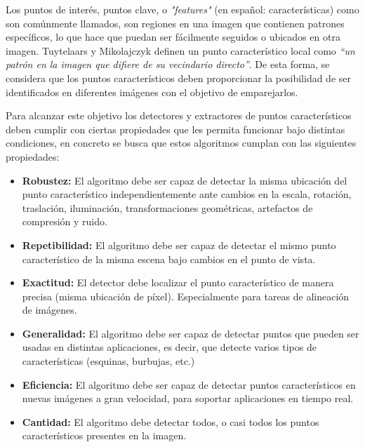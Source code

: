 Los puntos de interés, puntos clave, o \textit{"features"} (en español: características) como son comúnmente llamados, son regiones en una imagen que contienen patrones específicos, lo que hace que puedan ser fácilmente seguidos o ubicados en otra imagen. Tuytelaars y Mikolajczyk \cite{Tuytelaars} definen un punto característico local como \textit{``un patrón en la imagen que difiere de su vecindario directo''}. De esta forma, se considera que los puntos característicos deben proporcionar la posibilidad de ser identificados en diferentes imágenes con el objetivo de emparejarlos.

Para alcanzar este objetivo los detectores y extractores de puntos característicos deben cumplir con ciertas propiedades que les permita funcionar bajo distintas condiciones, en concreto se busca que estos algoritmos cumplan con las siguientes propiedades:

\begin{itemize}
	\item \textbf{Robustez:} El algoritmo debe ser capaz de detectar la misma ubicación del punto característico independientemente ante cambios en la escala, rotación, traslación, iluminación, transformaciones geométricas, artefactos de compresión y ruido.
	
	\item \textbf{Repetibilidad:} El algoritmo debe ser capaz de detectar el mismo punto característico de la misma escena bajo cambios en el punto de vista.
	
	\item \textbf{Exactitud:} El detector debe localizar el punto característico de manera precisa (misma ubicación de píxel). Especialmente para tareas de alineación de imágenes.
	
	\item \textbf{Generalidad:} El algoritmo debe ser capaz de detectar puntos que pueden ser usadas en distintas aplicaciones, es decir, que detecte varios tipos de características (esquinas, burbujas, etc.)
	
	\item \textbf{Eficiencia:} El algoritmo debe ser capaz de detectar puntos característicos en nuevas imágenes a gran velocidad, para soportar aplicaciones en tiempo real.
	
	\item \textbf{Cantidad:} El algoritmo debe detectar todos, o casi todos los puntos característicos presentes en la imagen. 
	
\end{itemize}



